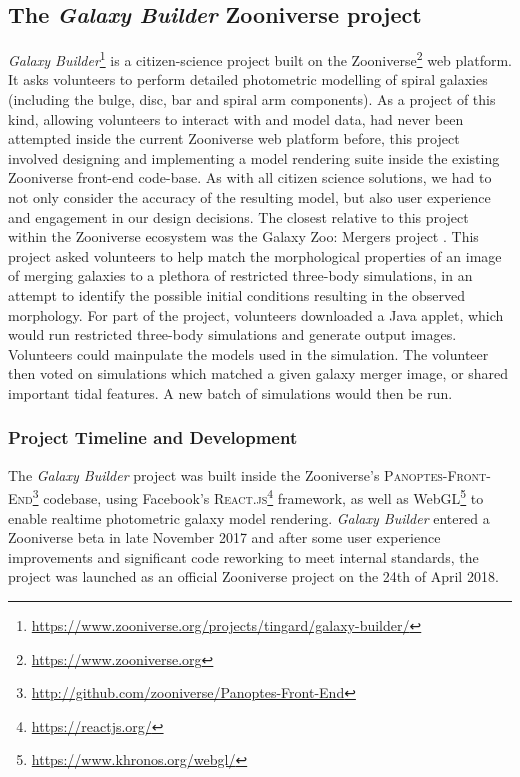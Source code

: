 \documentclass[../main.tex]{subfiles}
\begin{document}
\label{sec:method}

\subsection{The \textit{Galaxy Builder} Zooniverse project}

\textit{Galaxy Builder}\footnote{\url{https://www.zooniverse.org/projects/tingard/galaxy-builder/}} is a citizen-science project built on the Zooniverse\footnote{\url{https://www.zooniverse.org}} web platform. It asks volunteers to perform detailed photometric modelling of spiral galaxies (including the bulge, disc, bar and spiral arm components). As a project of this kind, allowing volunteers to interact with and model data, had never been attempted inside the current Zooniverse web platform before, this project involved designing and implementing a model rendering suite inside the existing Zooniverse front-end code-base. As with all citizen science solutions, we had to not only consider the accuracy of the resulting model, but also user experience and engagement in our design decisions. 
The closest relative to this project within the Zooniverse ecosystem was the Galaxy Zoo: Mergers project \citep{Holincheck2016:1604.00435v1}. This project asked volunteers to help match the morphological properties of an image of merging galaxies to a plethora of restricted three-body simulations, in an attempt to identify the possible initial conditions resulting in the observed morphology. For part of the project, volunteers downloaded a Java applet, which would run restricted three-body simulations and generate output images. Volunteers could mainpulate the models used in the simulation. The volunteer then voted on simulations which matched a given galaxy merger image, or shared important tidal features. A new batch of simulations would then be run.

\subsubsection{Project Timeline and Development}

The \textit{Galaxy Builder} project was built inside the Zooniverse's \citep{Simpson:2014:ZOW:2567948.2579215} \textsc{Panoptes-Front-End}\footnote{\url{http://github.com/zooniverse/Panoptes-Front-End}} codebase, using Facebook's \textsc{React.js}\footnote{\url{https://reactjs.org/}} framework, as well as WebGL\footnote{\url{https://www.khronos.org/webgl/}} to enable realtime photometric galaxy model rendering. \textit{Galaxy Builder} entered a Zooniverse beta in late November 2017 and after some user experience improvements and significant code reworking to meet internal standards, the project was launched as an official Zooniverse project on the 24th of April 2018.
\end{document}
